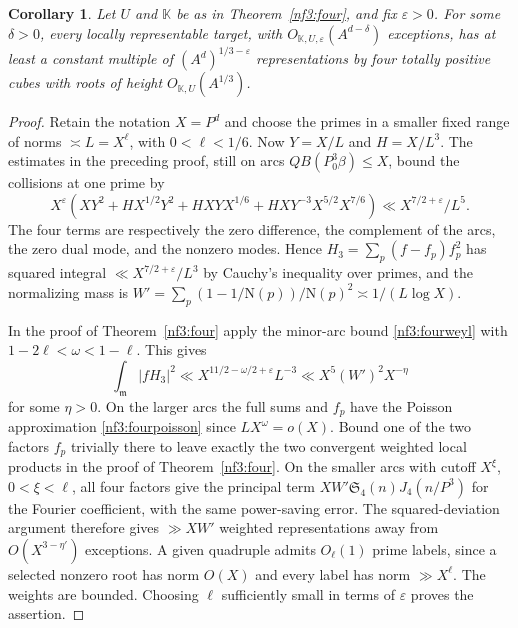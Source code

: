 \documentclass[11pt,letterpaper]{article}
\newtheorem{corollary}[corollary]{Corollary}
\theoremstyle{definition}
\numberwithin{equation}{section}
\begin{document}
\begin{corollary}\label{nf3:manyfour}
Let $U$ and $\mathbb K$ be as in Theorem~\ref{nf3:four}, and fix
$\varepsilon>0$. For some $\delta>0$, every locally representable target,
with $O_{\mathbb K,U,\varepsilon}(A^{d-\delta})$ exceptions, has at least
a constant multiple of $(A^d)^{1/3-\varepsilon}$ representations by four
totally positive cubes with roots of height $O_{\mathbb K,U}(A^{1/3})$.
\end{corollary}
\begin{proof}
Retain the notation $X=P^d$ and choose the primes in a smaller fixed
range of norms $\asymp L=X^\ell$, with $0<\ell<1/6$. Now $Y=X/L$
and $H=X/L^3$. The estimates in the preceding proof, still on arcs
$Q B(P_0^3\beta)\le X$, bound the collisions at one prime by
\[
 X^\varepsilon\left(
 XY^2+HX^{1/2}Y^2+HXY X^{1/6}
            +HX Y^{-3}X^{5/2}X^{7/6}\right)
 \ll X^{7/2+\varepsilon}/L^5 .
\]
The four terms are respectively the zero difference, the complement
of the arcs, the zero dual mode, and the nonzero modes. Hence
$H_3=\sum_p(f-f_p)f_p^2$ has squared integral
$\ll X^{7/2+\varepsilon}/L^3$ by Cauchy's inequality over primes, and the
normalizing mass is $W' = \sum_p (1-1/\mathrm N(p))/\mathrm N(p)^2
\asymp 1/(L\log X)$.

In the proof of Theorem~\ref{nf3:four} apply the minor-arc bound
\eqref{nf3:fourweyl} with $1-2\ell<\omega<1-\ell$. This gives
\[
 \int_{\mathfrak m}|fH_3|^2
 \ll X^{11/2-\omega/2+\varepsilon}L^{-3}
 \ll X^5(W')^2X^{-\eta}
\]
for some $\eta>0$. On the larger arcs the full sums and $f_p$ have
the Poisson approximation \eqref{nf3:fourpoisson} since
$L X^\omega=o(X)$. Bound one of the two factors $f_p$ trivially there to leave exactly the two convergent weighted local
products in the proof of Theorem~\ref{nf3:four}. On the smaller arcs
with cutoff $X^\xi$, $0<\xi<\ell$, all four factors give the principal
term $XW'\mathfrak S_4(n)J_4(n/P^3)$ for the Fourier coefficient,
with the same power-saving error. The squared-deviation argument
therefore gives $\gg XW'$ weighted representations away from
$O(X^{3-\eta'})$ exceptions. A given quadruple admits $O_\ell(1)$
prime labels, since a selected nonzero root has norm $O(X)$ and
every label has norm $\gg X^\ell$. The weights are bounded.
Choosing $\ell$ sufficiently small in terms of $\varepsilon$ proves
the assertion.
\end{proof}
\end{document}
